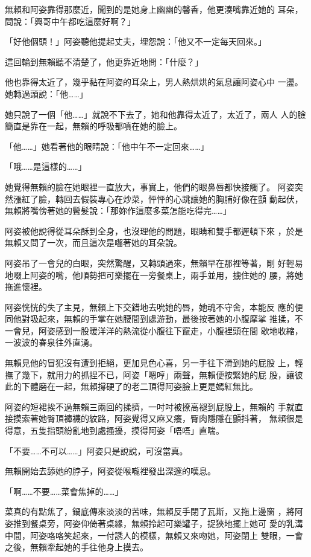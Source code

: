 無賴和阿姿靠得那麼近，聞到的是她身上幽幽的馨香，他更湊嘴靠近她的
耳朵，問說：「興哥中午都吃這麼好啊？」

「好他個頭！」阿姿聽他提起丈夫，埋怨說：「他又不一定每天回來。」

這回輪到無賴聽不清楚了，他更靠近地問：「什麼？」

他也靠得太近了，幾乎黏在阿姿的耳朵上，男人熱烘烘的氣息讓阿姿心中
一盪。她轉過頭說：「他……」

她只說了一個「他……」就說不下去了，她和他靠得太近了，太近了，兩人
人的臉簡直是靠在一起，無賴的呼吸都噴在她的臉上。

「他……」她看著他的眼睛說：「他中午不一定回來……」

「哦……是這樣的……」

她覺得無賴的臉在她眼裡一直放大，事實上，他們的眼鼻唇都快接觸了。
阿姿突然漲紅了臉，轉回去假裝專心在炒菜，怦怦的心跳讓她的胸脯好像在顫
動起伏，無賴將嘴傍著她的鬢髮說：「那妳作這麼多菜怎能吃得完……」

阿姿被他說得從耳朵酥到全身，也沒理他的問題，眼睛和雙手都遲頓下來
，於是無賴又問了一次，而且這次是囓著她的耳朵說。

阿姿吊了一會兒的白眼，突然驚醒，又轉頭過來，無賴早在那裡等著，剛
好輕易地啜上阿姿的嘴，他順勢把可樂擺在一旁餐桌上，兩手並用，擄住她的
腰，將她拖進懷裡。

阿姿恍恍的失了主見，無賴上下交錯地去吮她的唇，她魂不守舍，本能反
應的便同他對吸起來，無賴的手掌在她腰間到處游動，最後按著她的小腹摩挲
推揉，不一會兒，阿姿感到一股暖洋洋的熱流從小腹往下竄走，小腹裡頭在間
歇地收縮，一波波的春泉往外直湧。

無賴見他的冒犯沒有遭到拒絕，更加見色心喜，另一手往下滑到她的屁股
上，輕撫了幾下，就用力的抓捏不已，阿姿「嗯哼」兩聲，無賴便按緊她的屁
股，讓彼此的下體磨在一起，無賴撐硬了的老二頂得阿姿臉上更是嫣紅無比。

阿姿的短裙挨不過無賴三兩回的揉擠，一吋吋被撩高褪到屁股上，無賴的
手就直接摸索著她臀頂褲襪的紋路，阿姿覺得又麻又癢，臀肉隱隱在顫抖著，
無賴很是得意，五隻指頭紛亂地到處搔擾，摸得阿姿「唔唔」直喘。

「不要……不可以……」阿姿只是說說，可沒當真。

無賴開始去舔她的脖子，阿姿從喉嚨裡發出深邃的嘆息。

「啊……不要……菜會焦掉的……」

菜真的有點焦了，鍋底傳來淡淡的苦味，無賴反手閉了瓦斯，又拖上邊窗
，將阿姿推到餐桌旁，阿姿仰倚著桌緣，無賴拎起可樂罐子，捉狹地擺上她可
愛的乳溝中間，阿姿咯咯笑起來，一付誘人的模樣，無賴又來吻她，阿姿閉上
雙眼，一會之後，無賴牽起她的手往他身上摸去。

